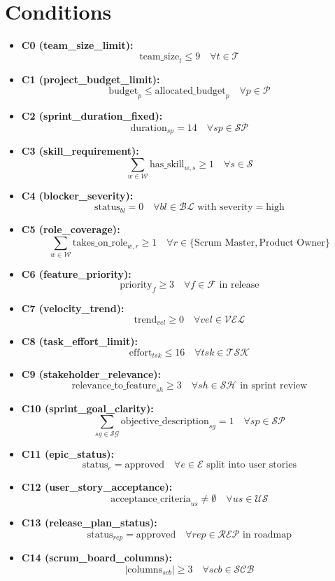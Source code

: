 \documentclass{article}
\begin{document}
\section{Conditions}
\begin{itemize}
    \item \textbf{C0 (team\_size\_limit):}
    \[
    \text{team\_size}_t \leq 9 \quad \forall t \in \mathcal{T}
    \]
    \item \textbf{C1 (project\_budget\_limit):}
    \[
    \text{budget}_p \leq \text{allocated\_budget}_p \quad \forall p \in \mathcal{P}
    \]
    \item \textbf{C2 (sprint\_duration\_fixed):}
    \[
    \text{duration}_{sp} = 14 \quad \forall sp \in \mathcal{SP}
    \]
    \item \textbf{C3 (skill\_requirement):}
    \[
    \sum_{w \in \mathcal{W}} \text{has\_skill}_{w,s} \geq 1 \quad \forall s \in \mathcal{S}
    \]
    \item \textbf{C4 (blocker\_severity):}
    \[
    \text{status}_{bl} = 0 \quad \forall bl \in \mathcal{BL} \text{ with severity} = \text{high}
    \]
    \item \textbf{C5 (role\_coverage):}
    \[
    \sum_{w \in \mathcal{W}} \text{takes\_on\_role}_{w,r} \geq 1 \quad \forall r \in \{\text{Scrum Master}, \text{Product Owner}\}
    \]
    \item \textbf{C6 (feature\_priority):}
    \[
    \text{priority}_f \geq 3 \quad \forall f \in \mathcal{F} \text{ in release}
    \]
    \item \textbf{C7 (velocity\_trend):}
    \[
    \text{trend}_{vel} \geq 0 \quad \forall vel \in \mathcal{VEL}
    \]
    \item \textbf{C8 (task\_effort\_limit):}
    \[
    \text{effort}_{tsk} \leq 16 \quad \forall tsk \in \mathcal{TSK}
    \]
    \item \textbf{C9 (stakeholder\_relevance):}
    \[
    \text{relevance\_to\_feature}_{sh} \geq 3 \quad \forall sh \in \mathcal{SH} \text{ in sprint review}
    \]
    \item \textbf{C10 (sprint\_goal\_clarity):}
    \[
    \sum_{sg \in \mathcal{SG}} \text{objective\_description}_{sg} = 1 \quad \forall sp \in \mathcal{SP}
    \]
    \item \textbf{C11 (epic\_status):}
    \[
    \text{status}_e = \text{approved} \quad \forall e \in \mathcal{E} \text{ split into user stories}
    \]
    \item \textbf{C12 (user\_story\_acceptance):}
    \[
    \text{acceptance\_criteria}_{us} \neq \emptyset \quad \forall us \in \mathcal{US}
    \]
    \item \textbf{C13 (release\_plan\_status):}
    \[
    \text{status}_{rep} = \text{approved} \quad \forall rep \in \mathcal{REP} \text{ in roadmap}
    \]
    \item \textbf{C14 (scrum\_board\_columns):}
    \[
    |\text{columns}_{scb}| \geq 3 \quad \forall scb \in \mathcal{SCB}
    \]
\end{itemize}
\end{document}
